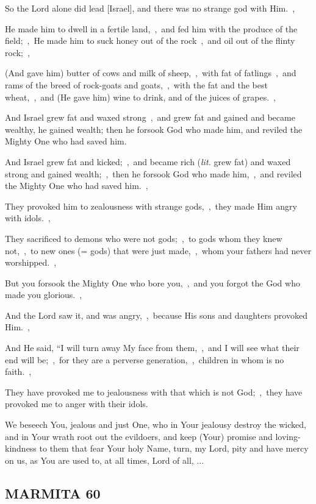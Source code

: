 \documentclass[12pt,twoside,a5paper]{article}
\newcommand{\marmita}[1]{\subsection*{MARMITA {#1}}}
\newcommand{\slota}[1]{\liturgicalhint{Slota.} #1}
\newcommand{\translationliteral}[1]{\emph{lit.} #1}
\begin{document}
\begin{normalparskip}
  So the Lord alone did lead [Israel], and there was no strange god with Him.~\sep

  He made him to dwell in a fertile land,~\sep\ and fed him with the produce of the field;~\sep\ He made him to suck honey out of the rock~\sep\ and oil out of the flinty rock;~\sep

  (And gave him) butter of cows and milk of sheep,~\sep\ with fat of fatlings~\sep\ and rams of the breed of rock-goats and goats,~\sep\ with the fat and the best wheat,~\sep\ and (He gave him) wine to drink, and of the juices of grapes.~\sep

  And Israel grew fat and waxed strong~\sep\ and grew fat and gained and became wealthy, he gained wealth; then he forsook God who made him, and reviled the Mighty One who had saved him.

  And Israel grew fat and kicked;~\sep\ and became rich (\translationliteral{grew fat}) and waxed strong and gained wealth;~\sep\ then he forsook God who made him,~\sep\ and reviled the Mighty One who had saved him.~\sep

  They provoked him to zealousness with strange gods,~\sep\ they made Him angry with idols.~\sep

  They sacrificed to demons who were not gods;~\sep\ to gods whom they knew not,~\sep\ to new ones (= gods) that were just made,~\sep\ whom your fathers had never worshipped.~\sep

  But you forsook the Mighty One who bore you,~\sep\ and you forgot the God who made you glorious.~\sep

  And the Lord saw it, and was angry,~\sep\ because His sons and daughters provoked Him.~\sep

  And He said, ``I will turn away My face from them,~\sep\ and I will see what their end will be;~\sep\ for they are a perverse generation,~\sep\ children in whom is no faith.~\sep

  They have provoked me to jealousness with that which is not God;~\sep\ they have provoked me to anger with their idols.
\end{normalparskip}

\slota{We beseech You, jealous and just One, who in Your jealousy destroy the wicked, and in Your wrath root out the evildoers, and keep (Your) promise and loving-kindness to them that fear Your holy Name, turn, my Lord, pity and have mercy on us, as You are used to, at all times, Lord of all, ...}

\marmita{60}
\end{document}
